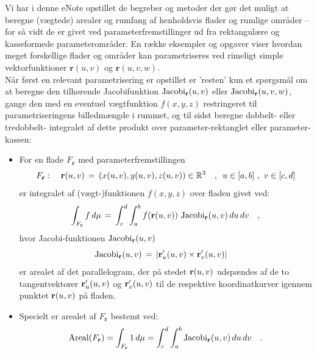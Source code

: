 \begin{summary}
Vi har i denne eNote opstillet de begreber og metoder der gør det muligt at beregne
(vægtede) arealer og rumfang af henholdsvis flader og rumlige områder -- for så vidt de er givet ved
parameterfremstillinger ud fra rektangulære og kasseformede  parameterområder. En række eksempler
og opgaver viser hvordan meget forskellige flader og områder kan parametriseres ved rimeligt simple
vektorfunktioner $\mathbf{r}(u,v)$ og $\mathbf{r}(u,v,w)$. \\

 Når først en relevant parametrisering er
opstillet er 'resten' kun et spørgsmål om at beregne den tilhørende Jacobifunktion $\operatorname{Jacobi}_{\mathbf{r}}(u,v)$ eller
$\operatorname{Jacobi}_{\mathbf{r}}(u,v,w)$, gange den med en eventuel vægtfunktion $f(x,y,z)$ restringeret til parametriseringens billedmængde i rummet, og til sidst beregne dobbelt- eller tredobbelt-
integralet af dette produkt over parameter-rektanglet eller parameter-kassen:
\begin{itemize}
\item For en flade $F_{\mathbf{r}}$ med parameterfremstillingen
\begin{equation}
F_{\bf r}: \quad {\bf r}(u,v) \, = \, \left(x(u,v), y(u,v),
z(u,v)\right) \in \mathbb{R}^3 \quad , \, \, \,  u \in [a,b] \, \,
, \, \,  v \in [c,d]
\end{equation}
er integralet af (vægt-)funktionen $f(x,y,z)$ over fladen givet ved:
\begin{equation}
\int_{F_{\bf r}} f \, d\mu \, = \, \int_{c}^{d} \int_{a}^{b}
f({\bf r}(u,v))\, \operatorname{Jacobi}_{\bf r}(u,v)\,du \, dv \quad,
\end{equation}
hvor {Jacobi-funktionen  $\operatorname{Jacobi}_{\bf r}(u,v)$}
\begin{equation}
 \operatorname{Jacobi}_{\bf r}(u,v)\, = \,  | {\bf r}'_{u}(u,v) \times {\bf
 r}'_{v}(u,v) |  \quad
\end{equation}
er arealet af det parallelogram, der på stedet
${\bf r}(u,v)$ udspændes af de to tangentvektorer
${\bf r}'_{u}(u,v)$ og ${\bf
 r}'_{v}(u,v)$ til de respektive koordinatkurver igennem punktet
${\bf r}(u,v)$ på fladen.
\item Specielt er arealet af $F_{\mathbf{r}}$ bestemt ved:
\begin{equation}
\operatorname{Areal}(F_{\bf r}) = \int_{F_{\bf r}} 1 \, d\mu = \int_{c}^{d} \int_{a}^{b} \operatorname{Jacobi}_{\bf r}(u,v)\,du \, dv \quad.
\end{equation}


\end{itemize}
\end{summary}

